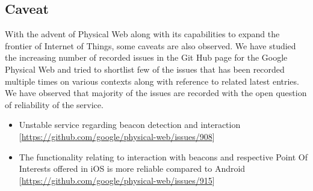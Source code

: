 \subsection{Caveat}

With the advent of Physical Web along with its capabilities to expand the frontier of  Internet of Things, some caveats are also observed. We have studied  the increasing number of  recorded issues in the Git Hub page for the Google Physical Web\cite{PhysicalWebIssues} and tried to shortlist few of the issues that has been recorded multiple times on various contexts along with reference to related latest entries. We have observed that majority of the issues are recorded with the open question of reliability of the service.

\begin{itemize}
	\item Unstable service regarding beacon detection and interaction [\url{https://github.com/google/physical-web/issues/908}]
	\item The functionality relating to interaction with beacons and respective Point Of Interests offered in iOS is more reliable compared to Android [\url{https://github.com/google/physical-web/issues/915}]
\end{itemize}